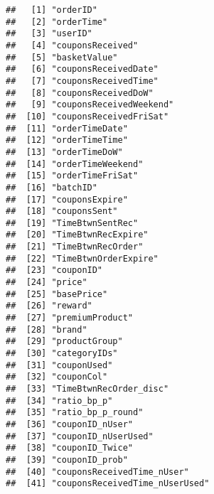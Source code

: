 \documentclass[10pt]{report}
\begin{document}
\begin{verbatim}
##   [1] "orderID"                                            
##   [2] "orderTime"                                          
##   [3] "userID"                                             
##   [4] "couponsReceived"                                    
##   [5] "basketValue"                                        
##   [6] "couponsReceivedDate"                                
##   [7] "couponsReceivedTime"                                
##   [8] "couponsReceivedDoW"                                 
##   [9] "couponsReceivedWeekend"                             
##  [10] "couponsReceivedFriSat"                              
##  [11] "orderTimeDate"                                      
##  [12] "orderTimeTime"                                      
##  [13] "orderTimeDoW"                                       
##  [14] "orderTimeWeekend"                                   
##  [15] "orderTimeFriSat"                                    
##  [16] "batchID"                                            
##  [17] "couponsExpire"                                      
##  [18] "couponsSent"                                        
##  [19] "TimeBtwnSentRec"                                    
##  [20] "TimeBtwnRecExpire"                                  
##  [21] "TimeBtwnRecOrder"                                   
##  [22] "TimeBtwnOrderExpire"                                
##  [23] "couponID"                                           
##  [24] "price"                                              
##  [25] "basePrice"                                          
##  [26] "reward"                                             
##  [27] "premiumProduct"                                     
##  [28] "brand"                                              
##  [29] "productGroup"                                       
##  [30] "categoryIDs"                                        
##  [31] "couponUsed"                                         
##  [32] "couponCol"                                          
##  [33] "TimeBtwnRecOrder_disc"                              
##  [34] "ratio_bp_p"                                         
##  [35] "ratio_bp_p_round"                                   
##  [36] "couponID_nUser"                                     
##  [37] "couponID_nUserUsed"                                 
##  [38] "couponID_Twice"                                     
##  [39] "couponID_prob"                                      
##  [40] "couponsReceivedTime_nUser"                          
##  [41] "couponsReceivedTime_nUserUsed"                      

\end{verbatim}
\end{document}
